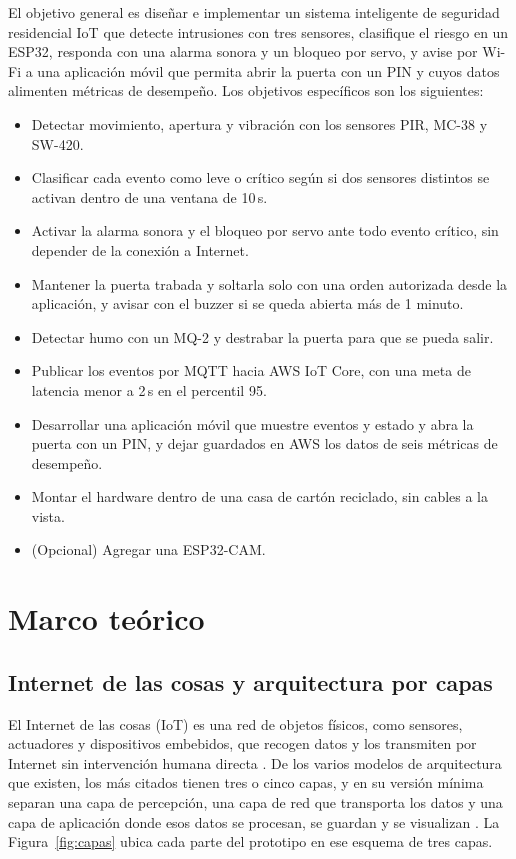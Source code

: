 \documentclass[manuscript,screen,nonacm]{acmart}
\begin{document}
El objetivo general es diseñar e implementar un sistema inteligente de seguridad residencial IoT que detecte intrusiones con tres sensores, clasifique el riesgo en un ESP32, responda con una alarma sonora y un bloqueo por servo, y avise por Wi-Fi a una aplicación móvil que permita abrir la puerta con un PIN y cuyos datos alimenten métricas de desempeño. Los objetivos específicos son los siguientes:
\begin{itemize}
  \item Detectar movimiento, apertura y vibración con los sensores PIR, MC-38 y SW-420.
  \item Clasificar cada evento como leve o crítico según si dos sensores distintos se activan dentro de una ventana de 10\,s.
  \item Activar la alarma sonora y el bloqueo por servo ante todo evento crítico, sin depender de la conexión a Internet.
  \item Mantener la puerta trabada y soltarla solo con una orden autorizada desde la aplicación, y avisar con el buzzer si se queda abierta más de 1 minuto.
  \item Detectar humo con un MQ-2 y destrabar la puerta para que se pueda salir.
  \item Publicar los eventos por MQTT hacia AWS IoT Core, con una meta de latencia menor a 2\,s en el percentil 95.
  \item Desarrollar una aplicación móvil que muestre eventos y estado y abra la puerta con un PIN, y dejar guardados en AWS los datos de seis métricas de desempeño.
  \item Montar el hardware dentro de una casa de cartón reciclado, sin cables a la vista.
  \item (Opcional) Agregar una ESP32-CAM.
\end{itemize}

\section{Marco teórico}
\label{sec:marco-teorico}

\subsection{Internet de las cosas y arquitectura por capas}
El Internet de las cosas (IoT) es una red de objetos físicos, como sensores, actuadores y dispositivos embebidos, que recogen datos y los transmiten por Internet sin intervención humana directa \cite{alfuqaha2015survey}. De los varios modelos de arquitectura que existen, los más citados tienen tres o cinco capas, y en su versión mínima separan una capa de percepción, una capa de red que transporta los datos y una capa de aplicación donde esos datos se procesan, se guardan y se visualizan \cite{alfuqaha2015survey, ray2018survey}. La Figura~\ref{fig:capas} ubica cada parte del prototipo en ese esquema de tres capas.
\end{document}

